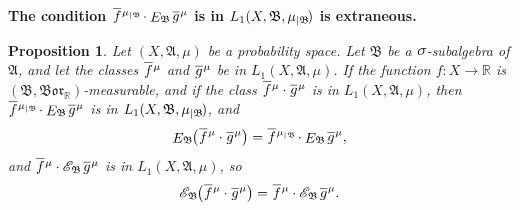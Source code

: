 \documentclass[
twoside=true,
paper=letter,
fontsize=9pt,
pagesize=auto,
leqno,
openany,
headsepline,
overfullrule,
]{scrbook}
\theoremstyle{plain}
\theoremstyle{plain}
\newtheorem{prop}[thm]{Proposition}
\theoremstyle{definition}
\theoremstyle{bfnoteitalic}
\theoremstyle{bfnoteroman}
\newcommand{\sigalg}[1]{\mathfrak{#1}}
\newcommand{\cali}[1]{\mathscr{#1}}
\newcommand{\kondexpsub}[2]
{\mathop{E}\nolimits_{#2}\hspace{-1pt}#1}
\newcommand{\condexpsub}[2]
{\mathop{\cali{E}\hspace{-1.5pt}}\nolimits_{#2}\hspace{-1pt}#1}
\newcommand{\borel}{\mathfrak{Bor}}
\newcommand{\textsigma}{\hbox{\large{$\sigma$}}\kern-1pt}
\newcommand{\restrictedto}[1]{_{\lvert#1}\kern-1.5pt}
\newcommand{\R}{\mathbb{R}}
\newcommand{\sigmaalgebra}{\sigalg{A}}
\newcommand{\sigmaalgebraii}{\sigalg{B}}
\newcommand{\funcf}{f}
\newcommand{\funcg}{g}
\newcommand{\function}{f}
\newcommand{\functionii}{g}
\newcommand{\measurespace}{X}
\newcommand{\measure}{\mu}
\newcommand{\measmu}{\mu}
\newcommand*\xbar[1]{%
   \hbox{%
     \vbox{%
       \hrule height 0.4pt %
       \kern0.4ex%
       \hbox{%
         \ensuremath{#1}%
       }%
     }%
   }%
}
\newcommand{\lebclass}[1]{\hspace{.5pt}\xbar{#1}\hspace{0.5pt}}
\newcommand{\ellclass}[2]{\lebclass{#1}^{#2}}
\begin{document}
\textbf{The condition
$\ellclass{\function}{\measmu\restrictedto{\sigmaalgebraii}}
\cdot
\kondexpsub{\ellclass{\funcg}{\measmu}}{\sigmaalgebraii}$
is in
$L_1(\measurespace, \sigmaalgebraii, \measmu\restrictedto{\sigmaalgebraii})$
is extraneous.}

\begin{prop} \label{measurable_functions_factor_out}
Let $(\measurespace, \sigmaalgebra,\measmu)$ be a probability space.
Let $\sigmaalgebraii$ be a $\textsigma$-subalgebra of $\sigmaalgebra$,
and let the classes
$\ellclass{\funcf}{\measmu}$
and
$\ellclass{\funcg}{\measmu}$ be in
$L_1(\measurespace, \sigmaalgebra,\measmu)$.
If the function $\function:\measurespace\to\R$ is
$(\sigmaalgebraii, \borel_\R)$\hyp{}measurable,  and if the class
$\ellclass{\funcf}{\measmu} \cdot \ellclass{\funcg}{\measmu}$
is in
$L_1(\measurespace, \sigmaalgebra,\measmu)$,
then
$\ellclass{\function}{\measure\restrictedto{\sigmaalgebraii}}
\cdot
\kondexpsub{\ellclass{\functionii}{\measure}}{\sigmaalgebraii}$
is in
$L_1(\measurespace, \sigmaalgebraii, \measmu\restrictedto{\sigmaalgebraii})$,
and
\[
\kondexpsub{\bigl(\ellclass{\function}{\measure} \cdot \ellclass{\functionii}{\measure}\bigr)}{\sigmaalgebraii}
= 
\ellclass{\function}{\measure\restrictedto{\sigmaalgebraii}}
\cdot
\kondexpsub{\ellclass{\functionii}{\measure}}{\sigmaalgebraii}
,\]
and
$\ellclass{\function}{\measure}
\cdot
\condexpsub{\ellclass{\functionii}{\measure}}{\sigmaalgebraii}$
is in
$L_1(\measurespace, \sigmaalgebra,\measmu)$,
so
\[
\condexpsub{\bigl(\ellclass{\function}{\measure} \cdot \ellclass{\functionii}{\measure}\bigr)}{\sigmaalgebraii}
= 
\ellclass{\function}{\measure}
\cdot
\condexpsub{\ellclass{\functionii}{\measure}}{\sigmaalgebraii}
.\]
\end{prop}
\end{document}
